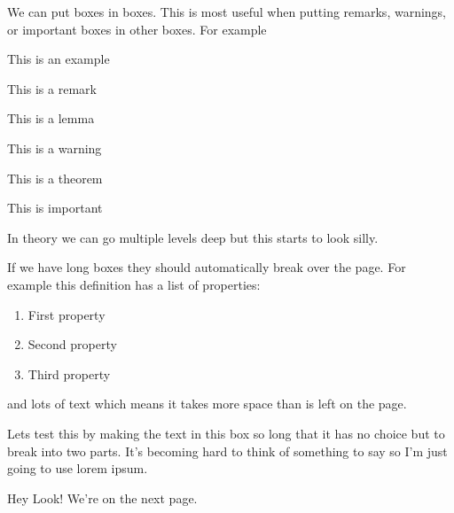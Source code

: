 \documentclass[fleqn, a4paper, openany]{memoir}
\begin{document}
    We can put boxes in boxes.
    This is most useful when putting remarks, warnings, or important boxes in other boxes.
    For example
    \begin{exm}{}{}
        This is an example
        \begin{rmk}
            This is a remark    
        \end{rmk}
    \end{exm}
    \begin{lma}{}{}
        This is a lemma
        \begin{wrn}
            This is a warning
        \end{wrn}
    \end{lma}
    \begin{thm}{}{}
        This is a theorem
        \begin{important}
            This is important
        \end{important}
    \end{thm}
    In theory we can go multiple levels deep but this starts to look silly.
    
    \begin{dfn}{}{}
        If we have long boxes they should automatically break over the page.
        For example this definition has a list of properties:
        \begin{enumerate}
            \item First property
            \item Second property
            \item Third property
        \end{enumerate}
        and lots of text which means it takes more space than is left on the page.
        
        Lets test this by making the text in this box so long that it has no choice but to break into two parts.
        It's becoming hard to think of something to say so I'm just going to use lorem ipsum.
        
        \blindtext
        
        Hey Look!
        We're on the next page.
    \end{dfn}{}{}
    \backmatter
    \printbibliography
\end{document}
